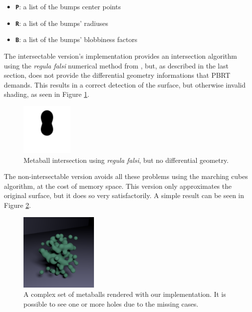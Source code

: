 \documentclass[conference]{acmsiggraph}
\begin{document}
\begin{itemize}
  \item \textbf{\texttt{P}}: a list of the bumps center points
  \item \textbf{\texttt{R}}: a list of the bumps' radiuses
  \item \textbf{\texttt{B}}: a list of the bumps' blobbiness factors
\end{itemize}

The intersectable version's implementation provides an intersection algorithm
using the \textit{regula falsi} numerical method from
\cite{Blinn:1982:GAS:965145.801290}, but, as described in the last section, does
not provide the differential geometry informations that PBRT demands. This
results in a correct detection of the surface, but otherwise invalid shading, as
seen in Figure \ref{img:regula-falsi}.

\begin{figure}[ht]
  \centering
  \includegraphics[width=1in]{images/intersection-black.png}
  \caption{Metaball intersection using \textit{regula falsi}, but no differential geometry.}
  \label{img:regula-falsi}
\end{figure}

The non-intersectable version avoids all these problems using the marching cubes
algorithm, at the cost of memory space. This version only approximates the original
surface, but it does so very satisfactorily. A simple result can be seen in Figure
\ref{img:marching-cubes}.

\begin{figure}[ht]
  \centering
  \includegraphics[width=1.5in]{images/blob.png}
  \caption{A complex set of metaballs rendered with our implementation. It is
           possible to see one or more holes due to the missing cases.}
  \label{img:marching-cubes}
\end{figure}
\end{document}
